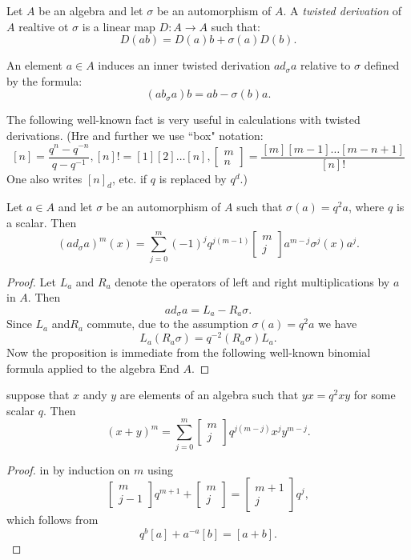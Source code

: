 Let $A$ be an algebra and let $\sigma$ be an automorphism of $A$. A \textit{twisted derivation} of $A$ realtive ot $\sigma$ is a linear map $D:A\rightarrow A$ such that:
$$
D(ab)=D(a)b+ \sigma(a)D(b).
$$
\begin{example*}
An element $a\in A$ induces an inner twisted derivation $ad_{\sigma}a$ relative to $\sigma$ defined by the formula:
$$
(ab_{\sigma}a)b=ab-\sigma(b)a.
$$

The following well-known fact is very useful in calculations with twisted derivations. (Hre and further we use ``box" notation:
$$ [n] = \dfrac{q^{n}-q^{-n}}{q-q^{-1}}, [n]! = [1][2]\ldots[n],
\begin{bmatrix}
m\\
n
\end{bmatrix}
= \dfrac{[m][m-1]\ldots[m-n+1]}{[n]!}
$$
One also writes $[n]_{d}$, etc. if $q$ is replaced by $q^{d}$.)
\end{example*}

\begin{prop*}
Let $a\in A$ and let $\sigma$ be an automorphism of $A$ such that $\sigma(a) = q^{2}a$, where $q$ is a scalar. Then
$$
(ad_{\sigma}a)^{m}(x)=\sum\limits_{j=0}^{m}(-1)^{j}q^{j(m-1)}
\begin{bmatrix}
m\\
j
\end{bmatrix}
a^{m-j}\sigma^{j}(x)a^{j}.
$$
\end{prop*}

\begin{proof}
Let $L_{a}$ and $R_{a}$ denote the operators of left and right multiplications by $a$ in $A$. Then
$$
ad_{\sigma}a= L_{a}-R_{a}\sigma.
$$
Since $L_{a}$ and$R_{a}$ commute, due to the assumption $\sigma(a)=q^{2}a$ we have
$$
L_{a}(R_{a}\sigma)=q^{-2}(R_{a}\sigma)L_{a}.
$$
Now the proposition is immediate from the following well-known binomial formula applied to the algebra End $A$.
\end{proof}

\begin{lemma*}
suppose that $x$ andy $y$ are elements of an algebra such that $yx=q^{2}xy$ for some scalar $q$. Then
$$
(x+y)^{m} = \sum\limits_{j=0}^{m}
\begin{bmatrix}
m\\
j
\end{bmatrix}
q^{j(m-j)}x^{j}y^{m-j}.
$$
\end{lemma*}

\begin{proof}
in by induction on $m$ using
$$
\begin{bmatrix}
m\\
j-1
\end{bmatrix}
q^{m+1} + 
\begin{bmatrix}
m\\
j
\end{bmatrix}
=
\begin{bmatrix}
m+1\\
j
\end{bmatrix}
q^{j},
$$
which follows from
$$
q^{b}[a]+ a^{-a}[b] = [a+b].
$$
\end{proof}

